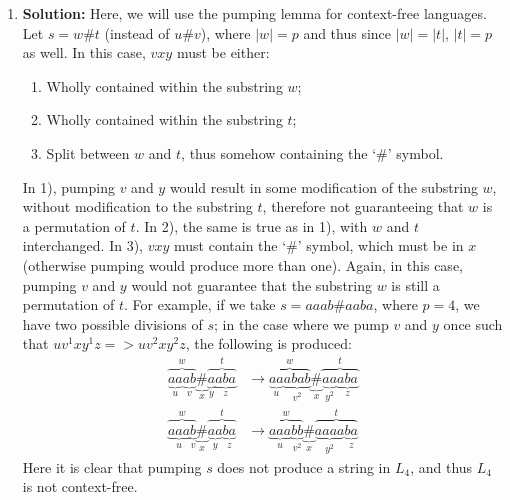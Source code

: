 \documentclass{article}
\begin{document}
\begin{enumerate}
    \item \textbf{Solution:}
    Here, we will use the pumping lemma for context-free languages. Let $s=w\#t$ (instead of $u\#v$), where $|w|=p$ and thus since $|w|=|t|$, $|t|=p$ as well. In this case, $vxy$ must be either:
    \begin{enumerate}
        \item Wholly contained within the substring $w$;
        \item Wholly contained within the substring $t$;
        \item Split between $w$ and $t$, thus somehow containing the `\#' symbol.
    \end{enumerate}
    In 1), pumping $v$ and $y$ would result in some modification of the substring $w$, without modification to the substring $t$, therefore not guaranteeing that $w$ is a permutation of $t$. 
    In 2), the same is true as in 1), with $w$ and $t$ interchanged.
    In 3), $vxy$ must contain the `\#' symbol, which must be in $x$ (otherwise pumping would produce more than one). Again, in this case, pumping $v$ and $y$ would not guarantee that the substring $w$ is still a permutation of $t$. For example, if we take $s=aaab\#aaba$, where $p=4$, we have two possible divisions of $s$; in the case where we pump $v$ and $y$ once such that $uv^{1}xy^{1}z => uv^{2}xy^{2}z$, the following is produced:
    \begin{align*}
       \overbrace{\underbrace{aa}_{u}\underbrace{ab}_{v}}^{w}\underbrace{\#}_{x}\overbrace{\underbrace{a}_{y}\underbrace{aba}_{z}}^{t} 
       &\to \overbrace{\underbrace{aa}_{u}\underbrace{abab}_{v^{2}}}^{w}\underbrace{\#}_{x}\overbrace{\underbrace{aa}_{y^{2}}\underbrace{aba}_{z}}^{t} \\ 
       \overbrace{\underbrace{aaa}_{u}\underbrace{b}_{v}}^{w}\underbrace{\#}_{x}\overbrace{\underbrace{aa}_{y}\underbrace{ba}_{z}}^{t}
       &\to \overbrace{\underbrace{aaa}_{u}\underbrace{bb}_{v^{2}}}^{w}\underbrace{\#}_{x}\overbrace{\underbrace{aaaa}_{y^{2}}\underbrace{ba}_{z}}^{t} 
    \end{align*}
    Here it is clear that pumping $s$ does not produce a string in $L_{4}$, and thus $L_{4}$ is not context-free. 


\end{enumerate}
\end{document}

